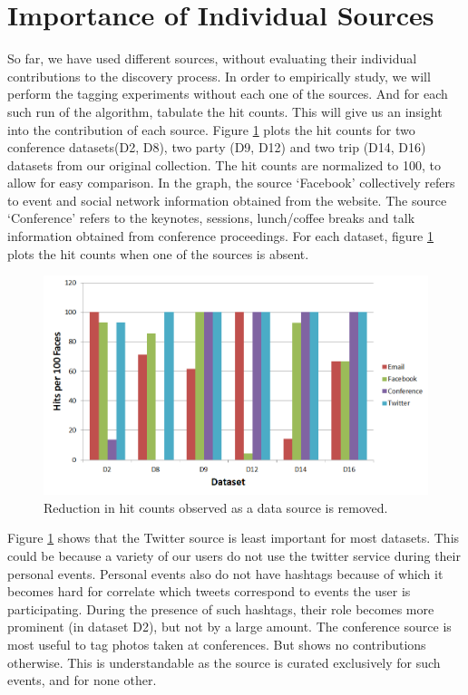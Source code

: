 \section{Importance of Individual Sources}

So far, we have used different sources, without evaluating their individual contributions to the discovery process. In order to empirically study, we will perform the tagging experiments without each one of the sources. And for each such run of the algorithm, tabulate the hit counts. This will give us an insight into the contribution of each source. Figure \ref{fig:source-benefits} plots the hit counts for two conference datasets(D2, D8), two party (D9, D12) and two trip (D14, D16) datasets from our original collection. The hit counts are normalized to 100, to allow for easy comparison. In the graph, the source `Facebook' collectively refers to event and social network information obtained from the website. The source `Conference' refers to the keynotes, sessions, lunch/coffee breaks and talk information obtained from conference proceedings. For each dataset, figure \ref{fig:source-benefits} plots the hit counts when one of the sources is absent.

\begin{figure}[t]
\centering
\includegraphics[width=\textwidth]{media/chapter5/axis/source-benefits.png}
\caption{Reduction in hit counts observed as a data source is removed.}
\label{fig:source-benefits}
\end{figure}

Figure \ref{fig:source-benefits} shows that the Twitter source is least important for most datasets. This could be because a variety of our users do not use the twitter service during their personal events. Personal events also do not have hashtags because of which it becomes hard for correlate which tweets correspond to events the user is participating. During the presence of such hashtags, their role becomes more prominent (in dataset D2), but not by a large amount. The conference source is most useful to tag photos taken at conferences. But shows no contributions otherwise. This is understandable as the source is curated exclusively for such events, and for none other. 

